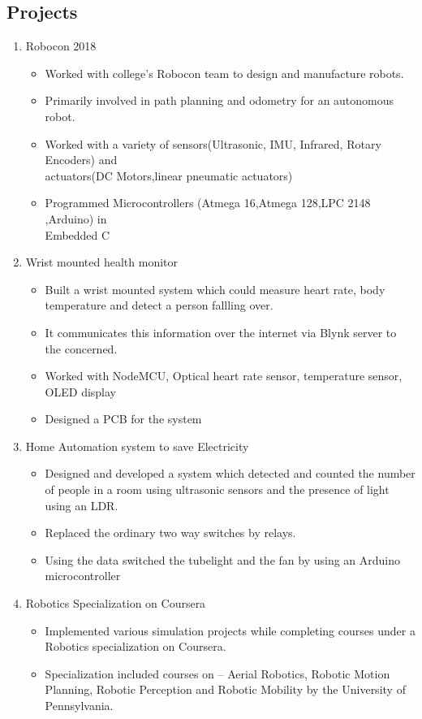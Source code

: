 \documentclass[margin,line]{res}
\begin{document}
\begin{resume}
\section{\sc Projects}
\begin{enumerate}
	\item Robocon 2018\\
	\begin{itemize}
		\item Worked with college’s Robocon team to design and manufacture robots.
		\item Primarily involved in path planning and odometry for an autonomous robot.
		\item Worked with a variety of sensors(Ultrasonic, IMU, Infrared, Rotary Encoders) and\\ actuators(DC 							Motors,linear pneumatic actuators)
		\item Programmed Microcontrollers (Atmega 16,Atmega 128,LPC 2148 ,Arduino) in\\ Embedded C	
	\end{itemize}
	\item Wrist mounted health monitor
	\begin{itemize}
		\item Built a wrist mounted system which could measure heart rate, body temperature and detect a person fallling over.
		\item It communicates this information over the internet via Blynk server to the concerned.  
		\item Worked with NodeMCU, Optical heart rate sensor, temperature sensor, OLED display
		\item Designed a PCB for the system
	\end{itemize}	
	\item Home Automation system to save Electricity
	\begin{itemize}
		\item Designed and developed a system which detected and counted the number of people in a room using 						ultrasonic sensors and the presence of light using an LDR.	
		\item Replaced the ordinary two way switches by relays.
		\item Using the data switched the tubelight and the fan by using an Arduino microcontroller	
	\end{itemize}
	\item Robotics Specialization on Coursera
	\begin{itemize}
		\item Implemented various simulation projects while completing courses under a Robotics specialization on Coursera. 				\item Specialization included courses on – Aerial Robotics, Robotic Motion Planning, Robotic Perception and Robotic 					Mobility by the University of Pennsylvania.	

\end{itemize}
\end{enumerate}
\end{resume}
\end{document}
